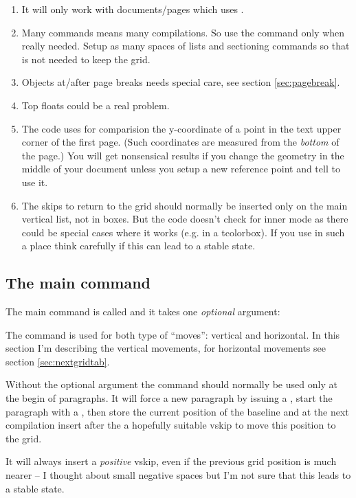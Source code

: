 \documentclass[twoside,parskip=half-,fontsize=12pt,egregdoesnotlikesansseriftitles,headings=normal]{scrartcl}
\begin{document}
\begin{enumerate}
\item It will only work with documents/pages which uses .
\item Many  commands means many compilations. So use the command only when really needed. Setup as many spaces of lists and sectioning commands so that  is not needed to keep the grid.
\item Objects at/after page breaks needs special care, see section \ref{sec:pagebreak}.
\item Top floats could be a real problem.
\item The code uses for comparision the y-coordinate of a point in the text upper corner of the first page. (Such coordinates are measured from the \emph{bottom} of the page.) You will get nonsensical results if you change the geometry in the middle of your document unless you setup a new reference point and tell  to use it.
\item The skips to return to the grid should normally be inserted only on the main vertical list, not in boxes. But the code doesn't check for inner mode as there could be special cases where it works (e.g. in a tcolorbox). If you use  in such a place think carefully if this can lead to a stable state.
\end{enumerate}

\subsection{The main command}

The main command is called  and it takes one \emph{optional} argument:

\DescribeMacro{}

The command is used for both type of \enquote{moves}: vertical and horizontal. In this section I'm describing the vertical movements, for horizontal movements see section \ref{sec:nextgridtab}.

Without the optional argument the command should normally be used only at the begin of paragraphs.  It will force a new paragraph by issuing a , start the paragraph with a , then store the current position of the baseline and at the next compilation insert after the  a hopefully suitable vskip to move this position to the grid.

It will always insert a \emph{positive} vskip, even if the previous grid position is much nearer -- I thought about small negative spaces but I'm not sure that this leads to a stable state.
\end{document}
